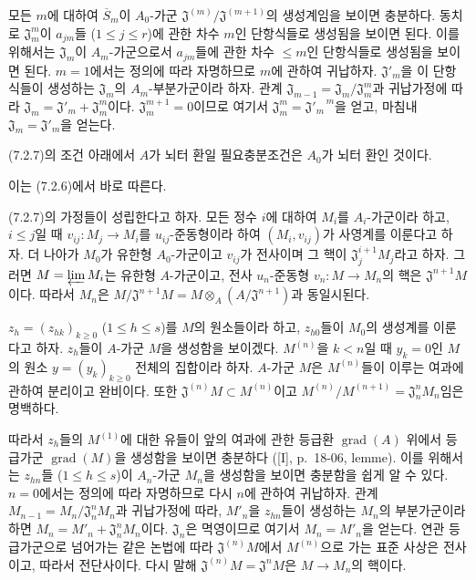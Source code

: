 
모든 $m$에 대하여 $\overline S_m$이 $A_0$-가군
$\mathfrak J^{(m)}/\mathfrak J^{(m+1)}$의 생성계임을 보이면
충분하다. 동치로 $\mathfrak J_m^m$이 $a_{jm}$들
($1\leq j\leq r$)에 관한 차수 $m$인 단항식들로 생성됨을 보이면
된다. 이를 위해서는 $\mathfrak J_m$이 $A_m$-가군으로서
$a_{jm}$들에 관한 차수 $\leq m$인 단항식들로 생성됨을 보이면
된다. $m=1$에서는 정의에 따라 자명하므로 $m$에 관하여 귀납하자.
$\mathfrak J'_m$을 이 단항식들이 생성하는
$\mathfrak J_m$의 $A_m$-부분가군이라 하자. 관계
$\mathfrak J_{m-1}=\mathfrak J_m/\mathfrak J_m^m$과 귀납가정에
따라 $\mathfrak J_m=\mathfrak J'_m+\mathfrak J_m^m$이다.
$\mathfrak J_m^{m+1}=0$이므로 여기서
$\mathfrak J_m^m={\mathfrak J'_m}^{\,m}$을 얻고, 마침내
$\mathfrak J_m=\mathfrak J'_m$을 얻는다.

\begin{corollary}[7.2.8]
\label{0.7.2.8-ko}
(7.2.7)의 조건 아래에서 $A$가 뇌터 환일 필요충분조건은 $A_0$가
뇌터 환인 것이다.
\end{corollary}

이는 (7.2.6)에서 바로 따른다.

\begin{proposition}[7.2.9]
\label{0.7.2.9-ko}
(7.2.7)의 가정들이 성립한다고 하자. 모든 정수 $i$에 대하여
$M_i$를 $A_i$-가군이라 하고, $i\leq j$일 때
$v_{ij}:M_j\to M_i$를 $u_{ij}$-준동형이라 하여
$(M_i,v_{ij})$가 사영계를 이룬다고 하자. 더 나아가 $M_0$가 유한형
$A_0$-가군이고 $v_{ij}$가 전사이며 그 핵이
$\mathfrak J_j^{i+1}M_j$라고 하자. 그러면
$M=\varprojlim M_i$는 유한형 $A$-가군이고, 전사
$u_n$-준동형 $v_n:M\to M_n$의 핵은
$\mathfrak J^{n+1}M$이다. 따라서 $M_n$은
$M/\mathfrak J^{n+1}M=M\otimes_A(A/\mathfrak J^{n+1})$과
동일시된다.
\end{proposition}

$z_h=(z_{hk})_{k\geq0}$ ($1\leq h\leq s$)를 $M$의 원소들이라
하고, $z_{h0}$들이 $M_0$의 생성계를 이룬다고 하자. $z_h$들이
$A$-가군 $M$을 생성함을 보이겠다. $M^{(n)}$을 $k<n$일 때
$y_k=0$인 $M$의 원소 $y=(y_k)_{k\geq0}$ 전체의 집합이라 하자.
$A$-가군 $M$은 $M^{(n)}$들이 이루는 여과에 관하여 분리이고
완비이다. 또한
$\mathfrak J^{(n)}M\subset M^{(n)}$이고
$M^{(n)}/M^{(n+1)}=\mathfrak J_n^nM_n$임은 명백하다.

따라서 $z_h$들의 $M^{(1)}$에 대한 유들이 앞의 여과에 관한
등급환 $\operatorname{grad}(A)$ 위에서 등급가군
$\operatorname{grad}(M)$을 생성함을 보이면 충분하다
([I], p.~18-06, lemme). 이를 위해서는 $z_{hn}$들
($1\leq h\leq s$)이 $A_n$-가군 $M_n$을 생성함을 보이면 충분함을
쉽게 알 수 있다. $n=0$에서는 정의에 따라 자명하므로 다시 $n$에
관하여 귀납하자. 관계
$M_{n-1}=M_n/\mathfrak J_n^nM_n$과 귀납가정에 따라, $M'_n$을
$z_{hn}$들이 생성하는 $M_n$의 부분가군이라 하면
$M_n=M'_n+\mathfrak J_n^nM_n$이다. $\mathfrak J_n$은 멱영이므로
여기서 $M_n=M'_n$을 얻는다. 연관 등급가군으로 넘어가는 같은
논법에 따라 $\mathfrak J^{(n)}M$에서 $M^{(n)}$으로 가는 표준
사상은 전사이고, 따라서 전단사이다. 다시 말해
$\mathfrak J^{(n)}M=\mathfrak J^nM$은 $M\to M_n$의 핵이다.


